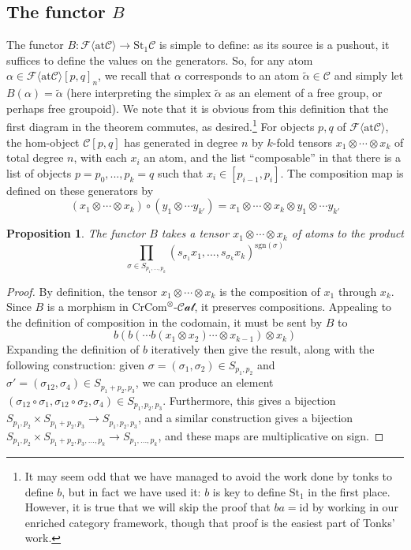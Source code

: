 \documentclass[12pt]{article}
\newtheorem{proposition}[theorem]{Proposition}
\theoremstyle{definition}
\newcommand{\C}{\mathcal{C}}
\newcommand{\crcom}{\text{CrCom}}
\newcommand{\tensorcrossedcat}{\crcom^\otimes\text{-}\mathcal{Cat}}
\newcommand{\id}{\text{id}}
\newcommand{\freeatom}[1]{\mathcal{F}\langle \text{at}{#1}\rangle}
\begin{document}
\subsection{The functor $B$}
	The functor $B: \mathcal{F}\langle \text{at}\C\rangle \to \text{St}_1\C$ is simple to define: as its source is a pushout, it suffices to define the values on the generators. So, for any atom $\alpha \in \freeatom{\C}[p,q]_n$, we recall that $\alpha$ corresponds to an atom $\tilde{\alpha} \in \C$ and simply let $B(\alpha) = \tilde{\alpha}$ (here interpreting the simplex $\tilde{\alpha}$ as an element of a free group, or perhaps free groupoid). We note that it is obvious from this definition that the first diagram in the theorem commutes, as desired.\footnote{It may seem odd that we have managed to avoid the work done by tonks to define $b$, but in fact we have used it: $b$ is key to define $\text{St}_1$ in the first place. However, it is true that we will skip the proof that $ba = \id$ by working in our enriched category framework, though that proof is the easiest part of Tonks' work.}
	For objects $p,q$ of $\freeatom{\C}$, the hom-object $\C[p,q]$ has generated in degree $n$ by $k$-fold tensors $x_1 \otimes \cdots \otimes x_k$ of total degree $n$, with each $x_i$ an atom, and the list ``composable'' in that there is a list of objects $p = p_0,...,p_k = q$ such that $x_i \in [p_{i-1}, p_i]$. The composition map is defined on these generators by 
	$$(x_1 \otimes \cdots \otimes x_k) \circ (y_1 \otimes \cdots y_{k'}) = x_1 \otimes \cdots \otimes x_k \otimes y_1 \otimes \cdots y_{k'}$$
\begin{proposition}
	The functor $B$ takes a tensor $x_1 \otimes \cdots \otimes x_k$ of atoms to the product
	$$\prod_{\sigma \in S_{p_1,...,p_k}} (s_{\sigma_1}x_1 ,..., s_{\sigma_k} x_k)^{\text{sgn}(\sigma)}$$
\end{proposition}
\begin{proof}
	By definition, the tensor $x_1 \otimes \cdots \otimes x_k$ is the composition of $x_1$ through $x_k$. Since $B$ is a morphism in $\tensorcrossedcat$, it preserves compositions. Appealing to the definition of composition in the codomain, it must be sent by $B$ to
$$
b(b(\cdots b(x_1 \otimes x_2) \cdots \otimes x_{k-1}) \otimes  x_k)
$$
Expanding the definition of $b$ iteratively then give the result, along with the following construction: given $\sigma = (\sigma_1,\sigma_2) \in S_{p_1,p_2}$ and $\sigma' = (\sigma_{12},\sigma_4) \in S_{p_1 + p_2,p_3}$, we can produce an element $(\sigma_{12}\circ\sigma_1, \sigma_{12} \circ \sigma_2, \sigma_4) \in S_{p_1,p_2,p_3}$. Furthermore, this gives a bijection $S_{p_1,p_2} \times S_{p_1 + p_2, p_3} \to S_{p_1,p_2,p_3}$, and a similar construction gives a bijection $S_{p_1,p_2} \times S_{p_1 + p_2,p_3,...,p_k} \to S_{p_1,...,p_k}$, and these maps are multiplicative on sign.
\end{proof}
\end{document}
